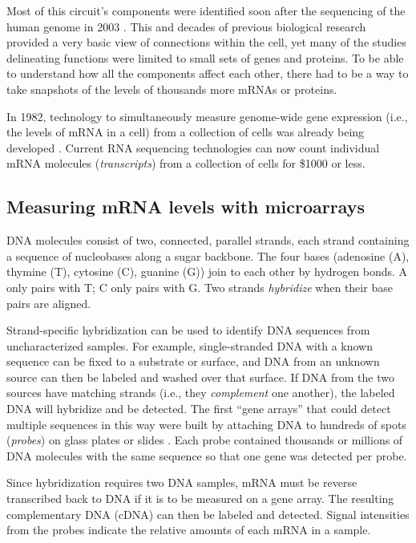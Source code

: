 Most of this circuit's components were identified soon after the
sequencing of the human genome in 2003 \cite{Consortium:2004bm,Gregory:2006tu}.
This and decades of previous biological research provided a very basic view
of connections within the cell, yet many of the studies delineating
functions were limited to small sets of genes and proteins.
To be able to understand how all the components affect each other,
there had to be a way to take snapshots of the levels of thousands more 
mRNAs or proteins.

In 1982, technology to simultaneously measure
genome-wide gene expression (i.e., the levels of mRNA in a cell)
from a collection of cells was already being developed \cite{Augenlicht:1982wo}. 
Current RNA sequencing technologies
can now count individual mRNA molecules (\textit{transcripts}) from a collection of cells
for \${}1000 or less.

\subsection{Measuring mRNA levels with microarrays}

DNA molecules consist of two, connected, parallel strands, each strand 
containing a sequence of nucleobases along a sugar backbone.
The four bases (adenosine (A), thymine (T), cytosine (C), guanine (G))
join to each other by hydrogen bonds. A only pairs with T; C only pairs with G.
Two strands \textit{hybridize} when their base pairs are aligned.

Strand-specific hybridization can be used to identify
DNA sequences from uncharacterized samples. For example, single-stranded DNA
with a known sequence
can be fixed to a substrate or surface, and DNA from an unknown
source can then be labeled and washed over that surface.
If DNA from the two sources have matching strands (i.e., they
\textit{complement} one another), the labeled
DNA will hybridize and be detected.
The first ``gene arrays'' that could detect multiple sequences in this way
were built by attaching 
DNA to hundreds of spots (\textit{probes}) on glass plates or 
slides \cite{Maskos:1992co, Augenlicht:1982wo}.
Each probe contained thousands or millions of DNA 
molecules with the same sequence so that one gene was detected per probe.

Since hybridization requires two DNA samples, mRNA must
be reverse transcribed back to DNA if it is to be measured on a gene array.
The resulting complementary DNA (cDNA)
can then be labeled and detected.
Signal intensities from the probes indicate the relative amounts of each
mRNA in a sample.


